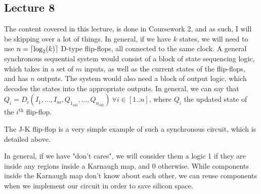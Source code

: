 \documentclass[a4paper, 12pt]{article}
\DeclarePairedDelimiter{\ceil}{\lceil}{\rceil}
\begin{document}
        \subsection*{Lecture 8}
            The content covered in this lecture, is done in Coursework 2, and as such, I will be skipping over a lot of things. In general, if we have $k$ states, we will need to use $n = \ceil{\mathrm{log}_2(k)}$ D-type flip-flops, all connected to the same clock. A general synchronous sequential system would consist of a block of state sequencing logic, which takes in a set of $m$ inputs, as well as the current states of the flip-flops, and has $n$ outputs. The system would also need a block of output logic, which decodes the states into the appropriate outputs. In general, we can say that $Q_i = D_i(I_1, ..., I_m, Q_{1_\text{old}}, ..., Q_{n_\text{old}})\ \forall i \in [1..n]$, where $Q_i$ the updated state of the $i^\text{th}$ flip-flop.
            \medskip

            The J-K flip-flop is a very simple example of such a synchronous circuit, which is detailed above.
            \medskip

            In general, if we have "don't cares", we will consider them a logic 1 if they are inside any regions inside a Karnaugh map, and 0 otherwise. While components inside the Karnaugh map don't know about each other, we can reuse components when we implement our circuit in order to save silicon space.
\end{document}
